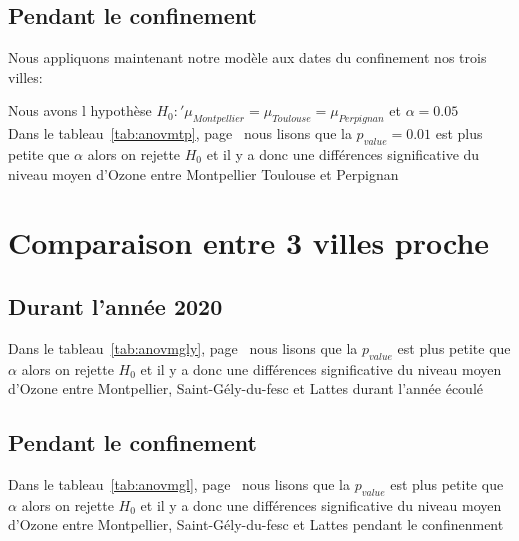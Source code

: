 \documentclass[a4paper,11pt,twoside,openright]{report}
\theoremstyle{plain}
\theoremstyle{definition}
\theoremstyle{remark}
\begin{document}
\subsection{Pendant le confinement}
\label{sec:pendant le confinement }

Nous appliquons maintenant notre modèle aux dates du confinement nos trois villes: 


Nous avons l hypothèse  $H_0 :'\mu_{Montpellier}=\mu_{Toulouse}=\mu_{Perpignan}$ et $\alpha=0.05$\\

Dans le tableau~\ref{tab:anovmtp}, page~\pageref{tab:anovmtp} nous lisons que la $p_{value} = 0.01$ est plus petite que $\alpha$ alors on rejette $H_0$  et il y a donc une différences significative du niveau moyen d'Ozone entre Montpellier Toulouse et Perpignan



\section{Comparaison entre 3 villes proche}
\label{sec:Comparaison entre 3 villes proche}





\subsection{Durant l'année 2020}
\label{sec:Durant l'année 2020}


Dans le tableau~\ref{tab:anovmgly}, page~\pageref{tab:anovmgly} nous lisons que la $p_{value}$  est plus petite que $\alpha$ alors on rejette $H_0$  et il y a donc une différences significative du niveau moyen d'Ozone entre Montpellier, Saint-Gély-du-fesc et Lattes durant l'année écoulé

\subsection{Pendant le confinement}
\label{sec:pendant le confinement }

Dans le tableau~\ref{tab:anovmgl}, page~\pageref{tab:anovmgl} nous lisons que la $p_{value}$  est plus petite que $\alpha$ alors on rejette $H_0$  et il y a donc une différences significative du niveau moyen d'Ozone entre Montpellier, Saint-Gély-du-fesc et Lattes pendant le confinenment



%


\end{document}

